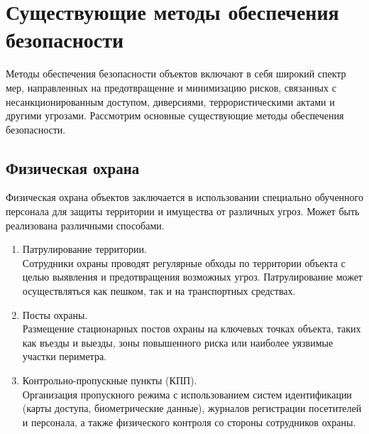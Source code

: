 \section{Существующие методы обеспечения безопасности} \label{ch1:sec2} 

Методы обеспечения безопасности объектов включают в себя широкий спектр мер, направленных на предотвращение и минимизацию рисков, связанных с несанкционированным доступом, диверсиями, террористическими актами и другими угрозами. Рассмотрим основные существующие методы обеспечения безопасности.

\subsection{Физическая охрана}
Физическая охрана объектов заключается в использовании специально обученного персонала для защиты территории и имущества от различных угроз. Может быть реализована различными способами.
\begin{enumerate}
    \item Патрулирование территории. \\
    Сотрудники охраны проводят регулярные обходы по территории объекта с целью выявления и предотвращения возможных угроз. Патрулирование может осуществляться как пешком, так и на транспортных средствах.
    \item Посты охраны. \\
    Размещение стационарных постов охраны на ключевых точках объекта, таких как въезды и выезды, зоны повышенного риска или наиболее уязвимые участки периметра. 
    \item Контрольно-пропускные пункты (КПП). \\
    Организация пропускного режима с использованием систем идентификации (карты доступа, биометрические данные), журналов регистрации посетителей и персонала, а также физического контроля со стороны сотрудников охраны.
\end{enumerate}
